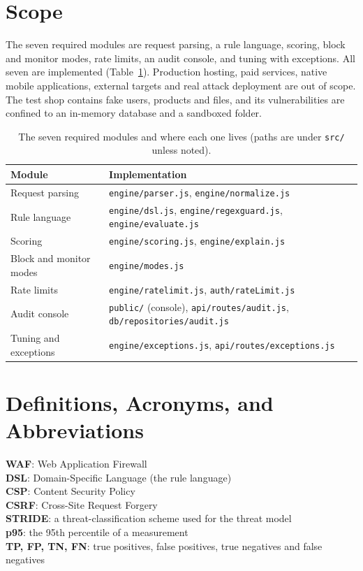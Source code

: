 \documentclass{FastFyp}
\begin{document}
\section{Scope}
The seven required modules are request parsing, a rule language, scoring, block and monitor modes, rate limits, an audit console, and tuning with exceptions. All seven are implemented (Table~\ref{tab:modules}). Production hosting, paid services, native mobile applications, external targets and real attack deployment are out of scope. The test shop contains fake users, products and files, and its vulnerabilities are confined to an in-memory database and a sandboxed folder.

\begin{table}[!h]
\centering
\caption{The seven required modules and where each one lives (paths are under \texttt{src/} unless noted).}
{\small\singlespacing\renewcommand{\arraystretch}{1.3}
\begin{tabular}{|p{4.0cm}|p{9.5cm}|}
\hline
\textbf{Module} & \textbf{Implementation} \\
\hline
Request parsing & \texttt{engine/parser.js}, \texttt{engine/normalize.js} \\
\hline
Rule language & \texttt{engine/dsl.js}, \texttt{engine/regexguard.js}, \texttt{engine/evaluate.js} \\
\hline
Scoring & \texttt{engine/scoring.js}, \texttt{engine/explain.js} \\
\hline
Block and monitor modes & \texttt{engine/modes.js} \\
\hline
Rate limits & \texttt{engine/ratelimit.js}, \texttt{auth/rateLimit.js} \\
\hline
Audit console & \texttt{public/} (console), \texttt{api/routes/audit.js}, \texttt{db/repositories/audit.js} \\
\hline
Tuning and exceptions & \texttt{engine/exceptions.js}, \texttt{api/routes/exceptions.js} \\
\hline
\end{tabular}}
\label{tab:modules}
\end{table}

\section{Definitions, Acronyms, and Abbreviations}
\textbf{WAF}: Web Application Firewall\\
\textbf{DSL}: Domain-Specific Language (the rule language)\\
\textbf{CSP}: Content Security Policy\\
\textbf{CSRF}: Cross-Site Request Forgery\\
\textbf{STRIDE}: a threat-classification scheme used for the threat model\\
\textbf{p95}: the 95th percentile of a measurement\\
\textbf{TP, FP, TN, FN}: true positives, false positives, true negatives and false negatives
\end{document}
